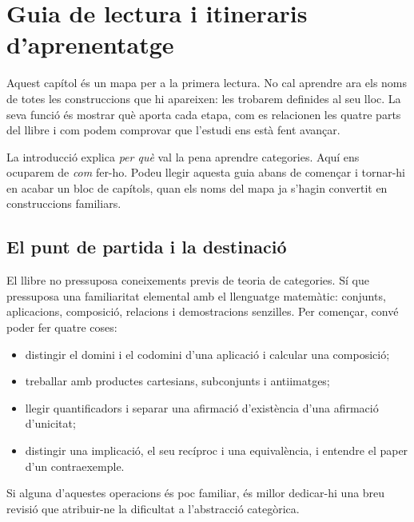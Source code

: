 \chapter*{\texorpdfstring{Guia de lectura i itineraris\\ d'aprenentatge}{Guia de lectura i itineraris d'aprenentatge}}

\begingroup
\renewcommand{\thesection}{\arabic{section}}
\setcounter{section}{0}
\setlength{\emergencystretch}{1.5em}

Aquest capítol és un mapa per a la primera lectura. No cal aprendre
ara els noms de totes les construccions que hi apareixen: les trobarem
definides al seu lloc. La seva funció és mostrar què aporta cada etapa,
com es relacionen les quatre parts del llibre i com podem comprovar
que l'estudi ens està fent avançar.

La introducció explica \emph{per què} val la pena aprendre categories.
Aquí ens ocuparem de \emph{com} fer-ho. Podeu llegir aquesta guia
abans de començar i tornar-hi en acabar un bloc de capítols, quan
els noms del mapa ja s'hagin convertit en construccions familiars.


\section{El punt de partida i la destinació}

El llibre no pressuposa coneixements previs de teoria de categories.
Sí que pressuposa una familiaritat elemental amb el llenguatge
matemàtic: conjunts, aplicacions, composició, relacions i
demostracions senzilles. Per començar, convé poder fer quatre coses:
\begin{itemize}
  \item distingir el domini i el codomini d'una aplicació i calcular
        una composició;
  \item treballar amb productes cartesians, subconjunts i antiimatges;
  \item llegir quantificadors i separar una afirmació d'existència
        d'una afirmació d'unicitat;
  \item distingir una implicació, el seu recíproc i una equivalència,
        i entendre el paper d'un contraexemple.
\end{itemize}
Si alguna d'aquestes operacions és poc familiar, és millor dedicar-hi
una breu revisió que atribuir-ne la dificultat a l'abstracció categòrica.

